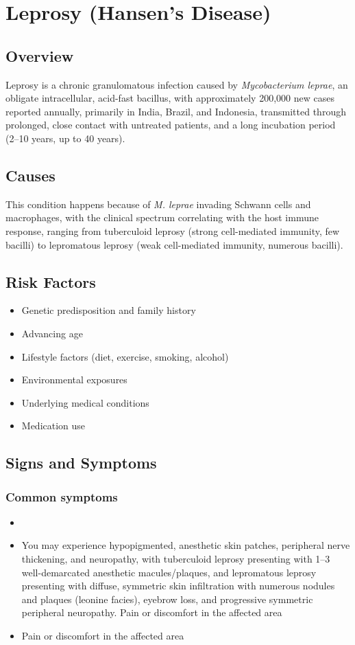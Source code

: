 \chapter{Leprosy (Hansen's Disease)}
\label{sec:Leprosy}

\section{Overview}
Leprosy is a chronic granulomatous infection caused by \textit{Mycobacterium leprae}, an obligate intracellular, acid-fast bacillus, with approximately 200,000 new cases reported annually, primarily in India, Brazil, and Indonesia, transmitted through prolonged, close contact with untreated patients, and a long incubation period (2--10 years, up to 40 years).
\section{Causes}
This condition happens because of \textit{M. leprae} invading Schwann cells and macrophages, with the clinical spectrum correlating with the host immune response, ranging from tuberculoid leprosy (strong cell-mediated immunity, few bacilli) to lepromatous leprosy (weak cell-mediated immunity, numerous bacilli).     
\section{Risk Factors}

\begin{itemize}[noitemsep]
  \item Genetic predisposition and family history
  \item Advancing age
  \item Lifestyle factors (diet, exercise, smoking, alcohol)
  \item Environmental exposures
  \item Underlying medical conditions
  \item Medication use
\end{itemize}
\section{Signs and Symptoms}

\subsection{Common symptoms}
\begin{itemize}[noitemsep]
  \item \item You may experience hypopigmented, anesthetic skin patches, peripheral nerve thickening, and neuropathy, with tuberculoid leprosy presenting with 1--3 well-demarcated anesthetic macules/plaques, and lepromatous leprosy presenting with diffuse, symmetric skin infiltration with numerous nodules and plaques (leonine facies), eyebrow loss, and progressive symmetric peripheral neuropathy. Pain or discomfort in the affected area    \item Pain or discomfort in the affected area
  \end{itemize}

